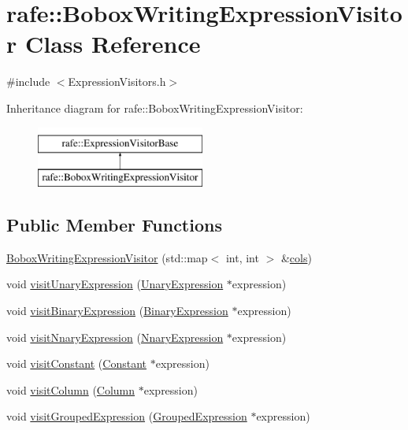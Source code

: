 \hypertarget{classrafe_1_1_bobox_writing_expression_visitor}{\section{rafe\+:\+:Bobox\+Writing\+Expression\+Visitor Class Reference}
\label{classrafe_1_1_bobox_writing_expression_visitor}
}


{\ttfamily \#include $<$Expression\+Visitors.\+h$>$}

Inheritance diagram for rafe\+:\+:Bobox\+Writing\+Expression\+Visitor\+:\begin{figure}[H]
\begin{center}
\leavevmode
\includegraphics[height=2.000000cm]{classrafe_1_1_bobox_writing_expression_visitor}
\end{center}
\end{figure}
\subsection*{Public Member Functions}
\begin{DoxyCompactItemize}
\item 
\hyperlink{classrafe_1_1_bobox_writing_expression_visitor_a212bf9dc5e42e80474f33bc3c2476020}{Bobox\+Writing\+Expression\+Visitor} (std\+::map$<$ int, int $>$ \&\hyperlink{classrafe_1_1_bobox_writing_expression_visitor_af77757b532d04695137bfa1a4e408f5c}{cols})
\item 
void \hyperlink{classrafe_1_1_bobox_writing_expression_visitor_aa2ebbdd925b785deb29d0ee1f326d917}{visit\+Unary\+Expression} (\hyperlink{classrafe_1_1_unary_expression}{Unary\+Expression} $\ast$expression)
\item 
void \hyperlink{classrafe_1_1_bobox_writing_expression_visitor_a4bf6fe93d12d89e40d30ef811442e666}{visit\+Binary\+Expression} (\hyperlink{classrafe_1_1_binary_expression}{Binary\+Expression} $\ast$expression)
\item 
void \hyperlink{classrafe_1_1_bobox_writing_expression_visitor_a4d004f836ea9b45c8a08de32cb72bdb3}{visit\+Nnary\+Expression} (\hyperlink{classrafe_1_1_nnary_expression}{Nnary\+Expression} $\ast$expression)
\item 
void \hyperlink{classrafe_1_1_bobox_writing_expression_visitor_a2228a1d5a64ae2ef765f5360b5eb9a30}{visit\+Constant} (\hyperlink{classrafe_1_1_constant}{Constant} $\ast$expression)
\item 
void \hyperlink{classrafe_1_1_bobox_writing_expression_visitor_a7c431ef8456be3affdb17692b99d8e50}{visit\+Column} (\hyperlink{classrafe_1_1_column}{Column} $\ast$expression)
\item 
void \hyperlink{classrafe_1_1_bobox_writing_expression_visitor_a5c00ebe39e50c4e6ad35f35a1248ef8e}{visit\+Grouped\+Expression} (\hyperlink{classrafe_1_1_grouped_expression}{Grouped\+Expression} $\ast$expression)
\end{DoxyCompactItemize}

